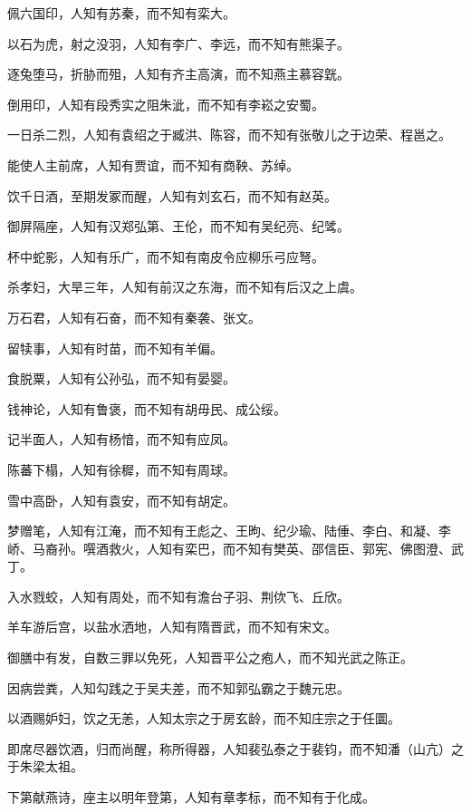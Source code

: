 \documentclass[a4paper,12pt,UTF8,twoside]{ctexbook}
\begin{document}
    佩六国印，人知有苏秦，而不知有栾大。
    
    以石为虎，射之没羽，人知有李广、李远，而不知有熊渠子。
    
    逐兔堕马，折胁而殂，人知有齐主高演，而不知燕主慕容皝。
    
    倒用印，人知有段秀实之阻朱泚，而不知有李崧之安蜀。
    
    一日杀二烈，人知有袁绍之于臧洪、陈容，而不知有张敬儿之于边荣、程邕之。
    
    能使人主前席，人知有贾谊，而不知有商鞅、苏绰。
    
    饮千日酒，至期发冢而醒，人知有刘玄石，而不知有赵英。
    
    御屏隔座，人知有汉郑弘第、王伦，而不知有吴纪亮、纪骘。
    
    杯中蛇影，人知有乐广，而不知有南皮令应柳乐弓应弩。
    
    杀孝妇，大旱三年，人知有前汉之东海，而不知有后汉之上虞。
    
    万石君，人知有石奋，而不知有秦袭、张文。
    
    留犊事，人知有时苗，而不知有羊偏。
    
    食脱粟，人知有公孙弘，而不知有晏婴。
    
    钱神论，人知有鲁褒，而不知有胡毋民、成公绥。
    
    记半面人，人知有杨愔，而不知有应凤。
    
    陈蕃下榻，人知有徐穉，而不知有周球。
    
    雪中高卧，人知有袁安，而不知有胡定。
    
    梦赠笔，人知有江淹，而不知有王彪之、王昫、纪少瑜、陆倕、李白、和凝、李峤、马裔孙。噀酒救火，人知有栾巴，而不知有樊英、邵信臣、郭宪、佛图澄、武丁。
    
    入水戮蛟，人知有周处，而不知有澹台子羽、荆佽飞、丘欣。
    
    羊车游后宫，以盐水洒地，人知有隋晋武，而不知有宋文。
    
    御膳中有发，自数三罪以免死，人知晋平公之疱人，而不知光武之陈正。
    
    因病尝粪，人知勾践之于吴夫差，而不知郭弘霸之于魏元忠。
    
    以酒赐妒妇，饮之无恙，人知太宗之于房玄龄，而不知庄宗之于任圜。
    
    即席尽器饮酒，归而尚醒，称所得器，人知裴弘泰之于裴钧，而不知潘（山亢）之于朱梁太祖。
    
    下第献燕诗，座主以明年登第，人知有章孝标，而不知有于化成。
    
\end{document}
